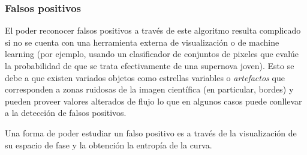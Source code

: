 \subsubsection{Falsos positivos}
El poder reconocer falsos positivos a trav\'es de este algoritmo resulta complicado si no se cuenta con una herramienta externa de visualizaci\'on o de machine learning (por ejemplo, usando un clasificador de conjuntos de pixeles que eval\'ue la probabilidad de que se trata efectivamente de una supernova joven). Esto se debe a que existen variados objetos como estrellas variables o \textit{artefactos} que corresponden a zonas ruidosas de la imagen  cient\'ifica (en particular, bordes) y pueden proveer valores alterados de flujo lo que en algunos casos puede conllevar a la detecci\'on de falsos positivos.
\bigskip

Una forma de poder estudiar un falso positivo es a trav\'es de la visualizaci\'on de su espacio de fase y la obtenci\'on la entrop\'ia de la curva.